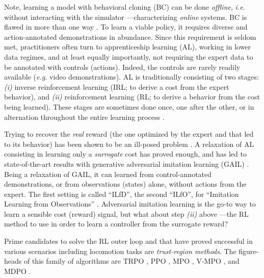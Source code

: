 \documentclass[12pt,a4paper]{article}
\begin{document}
Note, learning a model with behavioral cloning (BC)
\cite{Pomerleau1989-nh, Pomerleau1990-lm, Ratliff2007-fc}
can be done \textit{offline}, \textit{i.e.}
without interacting with the simulator ---characterizing \textit{online} systems. BC is flawed
in more than one way \cite{Ross2010-eb, Ross2011-dn}.
To learn a viable policy, it requires diverse and action-annotated demonstrations in abundance.
Since this requirement is seldom met, practitioners often turn to apprenticeship learning (AL),
working in lower data regimes, and at least equally importantly, not requiring the expert data
to be annotated with controls (actions).
Indeed, the controls are rarely readily available (\textit{e.g.} video demonstrations).
AL \cite{Abbeel2004-rb, Ratliff2006-kj, Kolter2008-mr} is traditionally consisting
of two stages: 
\textit{(i)} inverse reinforcement learning (IRL; to derive a cost from the expert behavior), and
\textit{(ii)} reinforcement learning (RL; to derive a behavior from the cost being learned).
These stages are sometimes done once, one after the other, or in alternation throughout the entire
learning process \cite{Ho2016-xn}.

Trying to recover the \textit{real} reward (the one optimized by the expert and that led to its
behavior) has been shown to be an ill-posed problem \cite{Ziebart2008-fe}.
A relaxation of AL consisting in learning only a \textit{surrogate} cost has proved enough,
and has led to state-of-the-art results with
generative adversarial imitation learning (GAIL) \cite{Ho2016-bv}.
Being a relaxation of GAIL, it can learned from control-annotated demonstrations, or from
observations (states) alone, without actions from the expert.
The first setting is called ``ILfD'', the second ``ILfO'', for ``Imitation Learning from
Observations'' \cite{Merel2017-lo, Liu2017-dr, Reed2018-ga, Fu2018-zu, Aytar2018-by,
Torabi2018-fg, Torabi2018-nb}.
Adversarial imitation learning is the go-to way to learn a sensible cost (reward) signal,
but what about step \textit{(ii)} above ---the RL method to use in order to learn
a controller from the surrogate reward?

Prime candidates to solve the RL outer loop and that have proved successful in various scenarios
including locomotion tasks are \emph{trust-region methods}.
The figure-heads of this family of algorithms
are TRPO \cite{Schulman2015-jt}, PPO \cite{Schulman2017-ou},
MPO \cite{Abdolmaleki2018-sp}, V-MPO \cite{Francis_Song2020-sd},
and MDPO \cite{Tomar2020-ts}.
\end{document}
